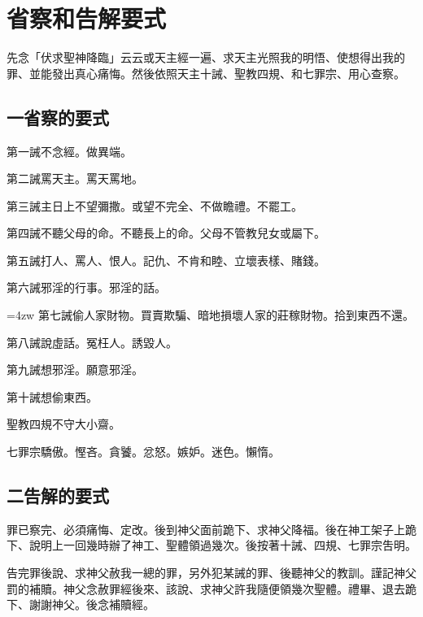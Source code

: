 \chapter[附錄 省察和告解要式]{省察和告解要式}
先念「伏求聖神降臨」云云或天主經一遍、求天主光照我的明悟、使想得出我的罪、並能發出真心痛悔。然後依照天主十誡、聖教四規、和七罪宗、用心查察。

\section*{一\quad 省察的要式}
第一誡\quad 不念經。做異端。

第二誡\quad 罵天主。罵天罵地。

第三誡\quad 主日上不望彌撒。或望不完全、不做瞻禮。不罷工。

第四誡\quad 不聽父母的命。不聽長上的命。父母不管教兒女或屬下。

第五誡\quad 打人、罵人、恨人。記仇、不肯和睦、立壞表樣、賭錢。

第六誡\quad 邪淫的行事。邪淫的話。

\hangindent=4zw 第七誡\quad 偷人家財物。買賣欺騙、暗地損壞人家的莊稼財物。拾到東西不還。

第八誡\quad 說虛話。冤枉人。誘毀人。

第九誡\quad 想邪淫。願意邪淫。

第十誡\quad 想偷東西。

聖教四規\quad 不守大小齋。

七罪宗\quad 驕傲。慳吝。貪饕。忿怒。嫉妒。迷色。懶惰。

\section*{二\quad 告解的要式}
罪已察完、必須痛悔、定改。後到神父面前跪下、求神父降福。{\cspace}後在神工架子上跪下、說明上一回幾時辦了神工、聖體領過幾次。後按著十誡、四規、七罪宗吿明。

告完罪後說、求神父赦我一總的罪，另外犯某誡的罪、後聽神父的教訓。謹記神父罰的補贖。{\cspace}神父念赦罪經後來、該說、求神父許我隨便領幾次聖體。禮畢、退去跪下、謝謝神父。後念補贖經。
